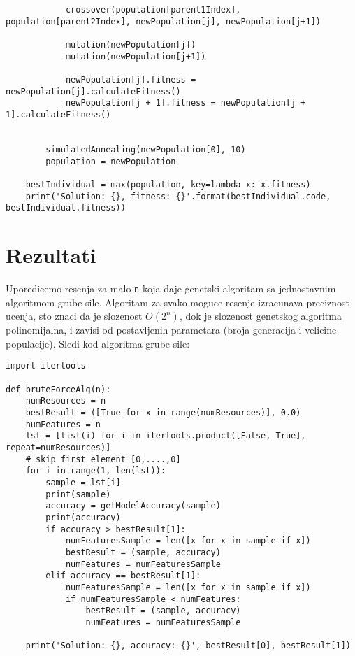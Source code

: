 \documentclass[11pt]{article} %
\begin{document}
\begin{lstlisting}
            crossover(population[parent1Index], population[parent2Index], newPopulation[j], newPopulation[j+1])

            mutation(newPopulation[j])
            mutation(newPopulation[j+1])

            newPopulation[j].fitness = newPopulation[j].calculateFitness()
            newPopulation[j + 1].fitness = newPopulation[j + 1].calculateFitness()


        simulatedAnnealing(newPopulation[0], 10)
        population = newPopulation

    bestIndividual = max(population, key=lambda x: x.fitness)
    print('Solution: {}, fitness: {}'.format(bestIndividual.code, bestIndividual.fitness))
\end{lstlisting}

\section{Rezultati}
Uporedicemo resenja za malo \lstinline{n} koja daje genetski algoritam sa jednostavnim algoritmom grube sile. Algoritam za svako moguce resenje izracunava preciznost ucenja, sto znaci da je slozenost \( O(2^n) \), dok je slozenost genetskog algoritma polinomijalna, i zavisi od postavljenih parametara (broja generacija i velicine populacije). Sledi kod algoritma grube sile:

\begin{lstlisting}
import itertools

def bruteForceAlg(n):
    numResources = n 
    bestResult = ([True for x in range(numResources)], 0.0)
    numFeatures = n
    lst = [list(i) for i in itertools.product([False, True], repeat=numResources)]
    # skip first element [0,....,0]
    for i in range(1, len(lst)):
        sample = lst[i]
        print(sample)
        accuracy = getModelAccuracy(sample)
        print(accuracy)
        if accuracy > bestResult[1]:
            numFeaturesSample = len([x for x in sample if x])
            bestResult = (sample, accuracy)
            numFeatures = numFeaturesSample
        elif accuracy == bestResult[1]:
            numFeaturesSample = len([x for x in sample if x])
            if numFeaturesSample < numFeatures:
                bestResult = (sample, accuracy)
                numFeatures = numFeaturesSample
                
    print('Solution: {}, accuracy: {}', bestResult[0], bestResult[1])
\end{lstlisting}
\end{document}
